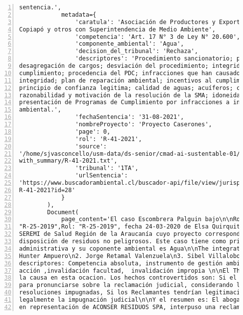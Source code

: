 \begin{Verbatim}[frame=lines, label=Elavoración propia -  Ejemplo de Contexto enviado por el Chatbot a OpenAI
				, fontsize=\scriptsize, numbers=left
				, baselinestretch=0.4
				, formatcom=\color{gray}]
sentencia.',
            metadata={
                'caratula': 'Asociación de Productores y Exportadores Agrícolas del Valle de
Copiapó y otros con Superintendencia de Medio Ambiente',
                'competencia': 'Art. 17 N° 3 de Ley N° 20.600',
                'componente_ambiental': 'Agua',
                'decision_del_tribunal': 'Rechaza',
                'descriptores': 'Procedimiento sancionatorio; programa de cumplimiento; SMA;
desagregación de cargos; desviación del procedimiento; integridad del programa de
cumplimiento; procedencia del PDC; infracciones que han causado daño ambiental; criterio de
integridad; plan de reparación ambiental; incentivos al cumplimiento; falta de perjuicio;
principio de confianza legitima; calidad de aguas; acuíferos; criterio de eficacia;
razonabilidad y motivación de la resolución de la SMA; idoneidad de las medidas; Guía para la
presentación de Programas de Cumplimiento por infracciones a instrumentos de carácter
ambiental.',
                'fechaSentencia': '31-08-2021',
                'nombreProyecto': 'Proyecto Caserones',
                'page': 0,
                'rol': 'R-41-2021',
                'source':
'/home/sjvasconcello/usm-data/ds-senior/cmad-ai-sustentable-01/etl/load/../../data/clean/docs_
with_summary/R-41-2021.txt',
                'tribunal': '1TA',
                'urlSentencia':
'https://www.buscadorambiental.cl/buscador-api/file/view/jurisprudencia/S1TA Rol N°
R-41-2021?id=28'
            }
        ),
        Document(
            page_content='El caso Escombrera Palguin bajo\n\nRol: "R-25-2019", Rol:
"R-25-2019",Rol: "R-25-2019", fecha 24-03-2020 de Elsa Quirquitripay Antiman y Otros con
SEREMI de Salud Región de la Araucanía cuyo proyecto corresponde a Escombrera, sitio de
disposición de residuos no peligrosos. Este caso tiene como principal materia Invalidación
administrativa y su coponente ambiental es Agua\n\nThe integration ministers are: \n1. Iván
Hunter Ampuero\n2. Jorge Retamal Valenzuela\n3. Sibel Villalobos Volpi\n\nSiendo sus
descriptores: Competencia absoluta, instrumento de gestión ambiental, legitimación activa,
acción ,invalidación facultad,  invalidación impropia \n\nEl Third Environmental Court Rechaza
la causa en esta ocacion. Los hechos controvertidos son: Si el Tribunal tendría competencia
para pronunciarse sobre la reclamación judicial, considerando la naturaleza de las
resoluciones impugnadas, Si los Reclamantes tendrían legitimación activa para ejercer
legalmente la impugnación judicial\n\nY el resumen es: El abogado Marco Antonio Román Cordero,
en representación de ACONSER RESIDUOS SPA, interpuso una reclamación contra la

\end{Verbatim}
